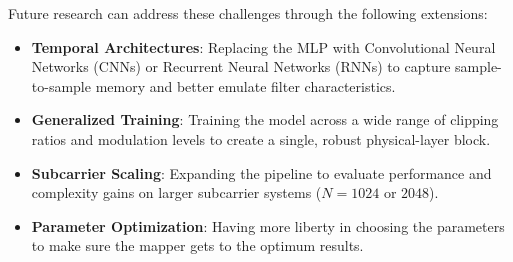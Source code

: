 Future research can address these challenges through the following extensions:
\begin{itemize}
    \item \textbf{Temporal Architectures}: Replacing the MLP with Convolutional Neural Networks (CNNs) or Recurrent Neural Networks (RNNs) to capture sample-to-sample memory and better emulate filter characteristics.
    \item \textbf{Generalized Training}: Training the model across a wide range of clipping ratios and modulation levels to create a single, robust physical-layer block.
    \item \textbf{Subcarrier Scaling}: Expanding the pipeline to evaluate performance and complexity gains on larger subcarrier systems ($N = 1024$ or $2048$).
    \item \textbf{Parameter Optimization}: Having more liberty in choosing the parameters to make sure the mapper gets to the optimum results.
\end{itemize}
